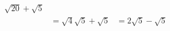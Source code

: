 \documentclass[preview]{standalone}
\begin{document}
\begin{align*}
\sqrt{20} + \sqrt{5}\\ &= \sqrt{4}\sqrt{5} + \sqrt{5}&= 2\sqrt{5} - \sqrt{5}
\end{align*}
\end{document}
